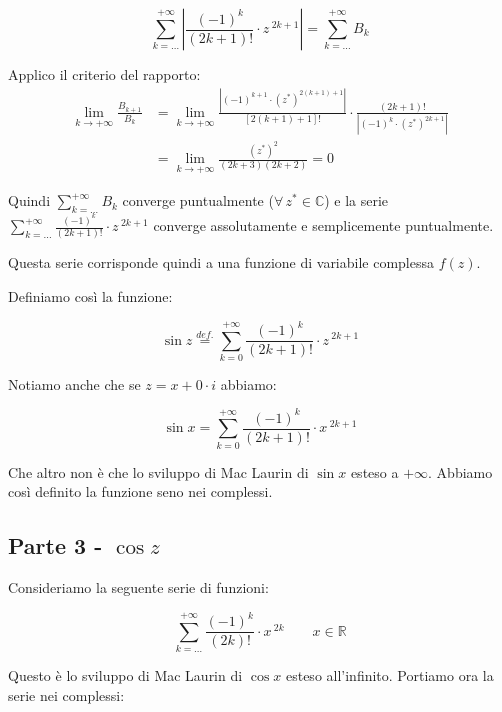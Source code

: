 \documentclass[../dimostrazioni]{subfiles}
\begin{document}
                \[  \sum_{k=\dots}^{+\infty} \left| \frac{(-1)^k}{(2k+1)!} \cdot z\,^{2k+1} \right| = \sum_{k=\dots}^{+\infty} B_k \]

                Applico il criterio del rapporto: %
                \begin{align*}
                    \lim_{k \to +\infty} \frac{B_{k+1}}{B_k} &= \lim_{k \to +\infty} \frac{\left| (-1)^{k+1} \cdot (z^*)^{2(k+1)+1}\right|}{\left[2(k+1)+1\right]!} \cdot \frac{\left(2k+1\right)!}{\left| (-1)^k \cdot (z^*)^{2k+1}\right|} \\
                    &= \lim_{k \to +\infty} \frac{(z^*)^2}{(2k+3)(2k+2)} = 0
                \end{align*}

                Quindi \(\sum_{k=\dots}^{+\infty} B_k\) converge puntualmente (\(\forall \, z^* \in \mathbb{C}\)) 
                e la serie  \(\sum_{k=\dots}^{+\infty} \frac{(-1)^k}{(2k+1)!} \cdot z\,^{2k+1}\) converge assolutamente e semplicemente puntualmente.

                Questa serie corrisponde quindi a una funzione di variabile complessa \(f(z)\).

                Definiamo così la funzione:

                \[  \sin z \stackrel{def.}{=} \sum_{k=0}^{+\infty} \frac{(-1)^k}{(2k+1)!} \cdot z\,^{2k+1}    \]

                Notiamo anche che se \(z = x + 0 \cdot i\) abbiamo:

                \[  \sin x = \sum_{k=0}^{+\infty} \frac{(-1)^k}{(2k+1)!} \cdot x\,^{2k+1} \]

                Che altro non è che lo sviluppo di Mac Laurin di \(\sin x\) esteso a \(+\infty\). 
                Abbiamo così definito la funzione seno nei complessi.

            \subsection*{Parte 3 - \(\cos z\)}

                Consideriamo la seguente serie di funzioni:
            
                \[  \sum_{k=\dots}^{+\infty} \frac{(-1)^k}{(2k)!} \cdot x\,^{2k} \qquad x \in \mathbb{R}  \]

                Questo è lo sviluppo di Mac Laurin di \(\cos x\) esteso all'infinito. Portiamo ora la serie nei complessi:
\end{document}
